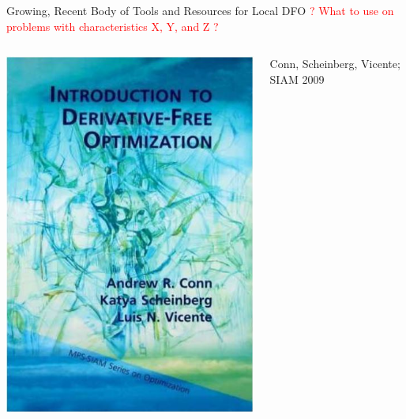 \documentclass[handout,aspectratio=54]{beamer}
\numberwithin{theorem}{section}
\begin{document}
\begin{frame}{Growing, Recent Body of Tools and Resources for Local DFO}
\textcolor{red}{? What to use on problems with characteristics X, Y, and Z ?}
\begin{columns}
\includegraphics[width=\textwidth]{fig/35-1.jpg}

\begin{center}\scriptsize
Conn, Scheinberg, Vicente; SIAM 2009
\end{center}


\end{columns}
\end{frame}
\end{document}
